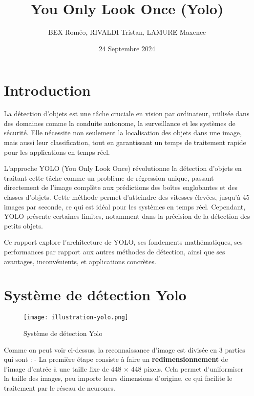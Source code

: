 \documentclass[a4paper,12pt]{article}
\title{You Only Look Once (Yolo)}
\author{BEX Roméo, RIVALDI Tristan, LAMURE Maxence}
\date{24 Septembre 2024}
\begin{document}
\maketitle

\begin{figure}[H]
\centering

\end{figure}




\tableofcontents


\newpage

\section*{Introduction}

La détection d'objets est une tâche cruciale en vision par ordinateur, utilisée dans des domaines comme la conduite autonome, la surveillance et les systèmes de sécurité. Elle nécessite non seulement la localisation des objets dans une image, mais aussi leur classification, tout en garantissant un temps de traitement rapide pour les applications en temps réel.

L'approche YOLO (You Only Look Once) révolutionne la détection d'objets en traitant cette tâche comme un problème de régression unique, passant directement de l'image complète aux prédictions des boîtes englobantes et des classes d'objets. Cette méthode permet d'atteindre des vitesses élevées, jusqu'à 45 images par seconde, ce qui est idéal pour les systèmes en temps réel. Cependant, YOLO présente certaines limites, notamment dans la précision de la détection des petits objets.

Ce rapport explore l'architecture de YOLO, ses fondements mathématiques, ses performances par rapport aux autres méthodes de détection, ainsi que ses avantages, inconvénients, et applications concrètes.

\section{Système de détection Yolo}

\begin{figure}[H]
    \centering
    \texttt{[image: illustration-yolo.png]}
    \caption{Système de détection Yolo}
    \label{fig:enter-label}
\end{figure}

Comme on peut voir ci-dessus, la reconnaissance d'image est divisée en 3 parties qui sont :    
- La première étape consiste à faire un \textbf{redimensionnement} de l'image d'entrée à une taille fixe de 448 × 448 pixels. Cela permet d'uniformiser la taille des images, peu importe leurs dimensions d'origine, ce qui facilite le traitement par le réseau de neurones.
\end{document}
